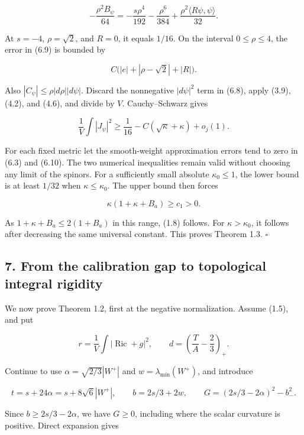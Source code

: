 \documentclass[
  11pt,
]{article}
\begin{document}
\[
 -\frac{\rho^2B_\psi}{64}
        =-\frac{s\rho^4}{192}-\frac{\rho^6}{384}
                                +\frac{\rho^2\langle R\psi,\psi\rangle}{32}.
 \tag{6.9}
\]

At \(s=-4\), \(\rho=\sqrt2\), and \(R=0\), it equals \(1/16\). On the
interval \(0\le\rho\le4\), the error in (6.9) is bounded by

\[
                  C\bigl(|e|+|\rho-\sqrt2|+|R|\bigr).
\]

Also \(|C_\psi|\le\rho|d\rho||d\psi|\). Discard the nonnegative
\(|d\psi|^2\) term in (6.8), apply (3.9), (4.2), and (4.6), and divide
by \(V\). Cauchy--Schwarz gives

\[
 \frac1V\int|J_\psi|^2
                   \ge\frac1{16}-C(\sqrt\kappa+\kappa)+o_j(1).
 \tag{6.10}
\]

For each fixed metric let the smooth-weight approximation errors tend to
zero in (6.3) and (6.10). The two numerical inequalities remain valid
without choosing any limit of the spinors. For a sufficiently small
absolute \(\kappa_0\le1\), the lower bound is at least \(1/32\) when
\(\kappa\le\kappa_0\). The upper bound then forces

\[
                         \kappa(1+\kappa+B_a)\ge c_1>0.
\]

As \(1+\kappa+B_a\le2(1+B_a)\) in this range, (1.8) follows. For
\(\kappa>\kappa_0\), it follows after decreasing the same universal
constant. This proves Theorem 1.3. \(\square\)

\hypertarget{from-the-calibration-gap-to-topological-integral-rigidity}{%
\subsection{7. From the calibration gap to topological integral
rigidity}\label{from-the-calibration-gap-to-topological-integral-rigidity}}

We now prove Theorem 1.2, first at the negative normalization. Assume
(1.5), and put

\[
 r=\frac1V\int|\operatorname{Ric}+g|^2,\qquad
 d=\left(\frac TA-\frac23\right)_+.
\]

Continue to use \(\alpha=\sqrt{2/3}|W^+|\) and
\(w=\lambda_{\min}(W^+)\), and introduce

\[
 t=s+24\alpha=s+8\sqrt6|W^+|,\qquad
 b=2s/3+2w,\qquad
 G=(2s/3-2\alpha)^2-b_-^2.                               \tag{7.1}
\]

Since \(b\ge2s/3-2\alpha\), we have \(G\ge0\), including where the
scalar curvature is positive. Direct expansion gives
\end{document}
